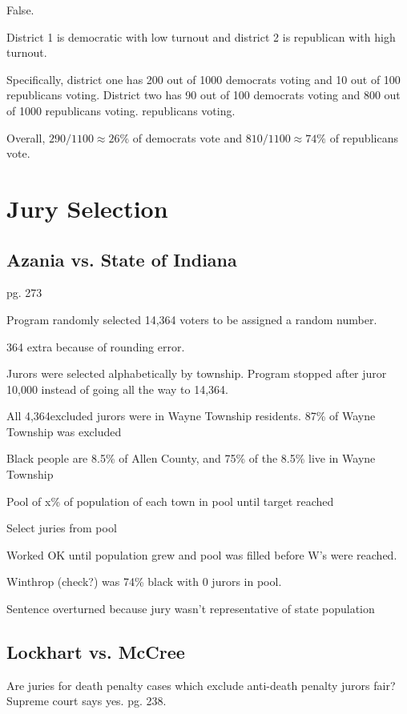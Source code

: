 \documentclass[landscape]{exam}
\begin{document}
  \begin{solution}
    False.  
    
    District 1 is democratic with low turnout and district 2 is republican with
    high turnout.  
    
    Specifically, district one has 200 out of 1000 democrats voting and 10 out
    of 100 republicans voting.  District two has 90 out of 100 democrats voting
    and 800 out of 1000 republicans voting.  republicans voting.  

    Overall, $290/1100 \approx 26\%$ of democrats vote and 
    $810/1100 \approx 74\%$ of republicans vote.

  \end{solution}
  \section{Jury Selection}

  \subsection{Azania vs. State of Indiana}

  pg. 273

  \begin{itemize*}
    \item Program randomly selected 14,364 voters to be assigned a random
      number.
    \item 364 extra because of rounding error.
    \item Jurors were selected alphabetically by township.  Program stopped
      after juror 10,000 instead of going all the way to 14,364.    
    \item All 4,364excluded jurors were in Wayne Township residents.  87\% of
      Wayne Township was excluded
    \item Black people are 8.5\% of Allen County, and 75\% of the 8.5\% live in
      Wayne Township
  \end{itemize*}

    \begin{itemize*}
    \item Pool of x\% of population of each town in pool until target reached
    \item Select juries from pool
    \item Worked OK until population grew and pool was filled before W's were
      reached.
    \item Winthrop (check?) was 74\% black with 0 jurors in pool.
    \item Sentence overturned because jury wasn't representative of state
      population
  \end{itemize*}

  \subsection{Lockhart vs. McCree}
  Are juries for death penalty cases which exclude anti-death penalty jurors
  fair?  Supreme court says yes. pg. 238.
\end{document}
